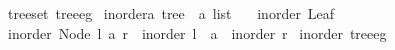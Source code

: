 \begin{isabellebody}
\isanewline
{}\isamarkupfalse%
\ {\isachardoublequoteopen}tree{\isacharunderscore}{\kern0pt}set\ tree{\isacharunderscore}{\kern0pt}eg{\isachardoublequoteclose}\isanewline
\isanewline
{}\isamarkupfalse%
\ inorder{\isacharcolon}{\kern0pt}{\isacharcolon}{\kern0pt}{\isachardoublequoteopen}{\isacharprime}{\kern0pt}a\ tree\ {\isasymRightarrow}\ {\isacharprime}{\kern0pt}a\ list{\isachardoublequoteclose}\ \isanewline
\ \ {\isachardoublequoteopen}inorder\ Leaf\ {\isacharequal}{\kern0pt}\ {\isacharbrackleft}{\kern0pt}{\isacharbrackright}{\kern0pt}{\isachardoublequoteclose}\isanewline
{\isacharbar}{\kern0pt}\ {\isachardoublequoteopen}inorder\ {\isacharparenleft}{\kern0pt}Node\ l\ a\ r{\isacharparenright}{\kern0pt}\ {\isacharequal}{\kern0pt}\ {\isacharparenleft}{\kern0pt}inorder\ l{\isacharparenright}{\kern0pt}\ {\isacharat}{\kern0pt}\ {\isacharbrackleft}{\kern0pt}a{\isacharbrackright}{\kern0pt}\ {\isacharat}{\kern0pt}\ {\isacharparenleft}{\kern0pt}inorder\ r{\isacharparenright}{\kern0pt}{\isachardoublequoteclose}\isanewline
\isanewline
{}\isamarkupfalse%
\ {\isachardoublequoteopen}inorder\ tree{\isacharunderscore}{\kern0pt}eg{\isachardoublequoteclose}\isanewline
%
\isadelimtheory
\isanewline
%
\endisadelimtheory
%
\isatagtheory
{}\isamarkupfalse%
%
\endisatagtheory
{\isafoldtheory}%
%
\isadelimtheory
%
\endisadelimtheory
%
\end{isabellebody}%
\endinput
